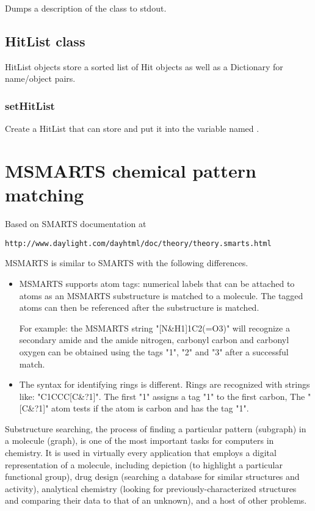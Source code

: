 \begin{itemize}
Dumps a description of the class to stdout.

\section{HitList class}
  HitList objects store a sorted list of Hit objects as well as a Dictionary for name/object pairs.

\subsection{setHitList}
  \par
  Create a HitList that can store  and put it into the variable named .

\chapter{MSMARTS chemical pattern matching}

Based on SMARTS documentation at 
\begin{verbatim}
http://www.daylight.com/dayhtml/doc/theory/theory.smarts.html
\end{verbatim}

MSMARTS is similar to SMARTS with the following differences.
\begin{itemize}
	\item MSMARTS supports atom tags: numerical labels that can be attached to atoms as an MSMARTS substructure is matched to a molecule. The tagged atoms can then be referenced after the substructure is matched.

	For example: the MSMARTS string "[N\&H1]1C2(=O3)" will recognize a secondary amide and the amide nitrogen, carbonyl carbon and carbonyl oxygen can be obtained using the tags "1", "2" and "3" after a successful match.
	\item The syntax for identifying rings is different. Rings are recognized with strings like: "C1CCC[C\&?1]".  The first "1" assigns a tag "1" to the first carbon, The "[C\&?1]" atom tests if the atom is carbon and has the tag "1".
\end{itemize}

   Substructure searching, the process of finding a particular pattern (subgraph) in a molecule (graph), is one of the most important tasks for computers in chemistry. It is used in virtually every application that employs a digital representation of a molecule, including depiction (to highlight a particular functional group), drug design (searching a database for similar structures and activity), analytical chemistry (looking for previously-characterized structures and comparing their data to that of an unknown), and a host of other problems.


\end{itemize}
